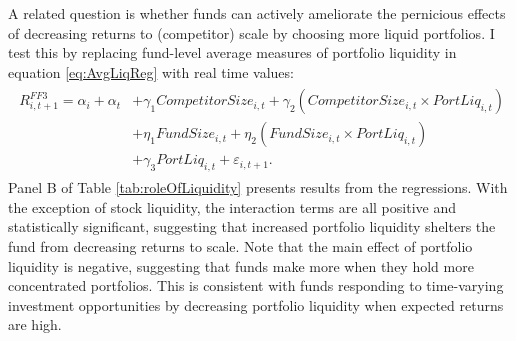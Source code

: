 \documentclass[]{book}
\theoremstyle{definition}
\theoremstyle{definition}
\theoremstyle{definition}
\theoremstyle{remark}
\begin{document}
A related question is whether funds can actively ameliorate the
pernicious effects of decreasing returns to (competitor) scale by
choosing more liquid portfolios. I test this by replacing fund-level
average measures of portfolio liquidity in equation \eqref{eq:AvgLiqReg}
with real time values: \begin{align}
\begin{split}
R^{FF3}_{i,t+1} = \alpha_i + \alpha_t &+ \gamma_1 CompetitorSize_{i,t} + \gamma_2 \left( CompetitorSize_{i,t} \times PortLiq_{i,t} \right) \\ 
&+ \eta_1 FundSize_{i,t} + \eta_2 \left( FundSize_{i,t} \times PortLiq_{i,t} \right)  \\
&+\gamma_3 PortLiq_{i,t} + \varepsilon_{i,t+1}.
\end{split}
\end{align} Panel B of Table \ref{tab:roleOfLiquidity} presents results
from the regressions. With the exception of stock liquidity, the
interaction terms are all positive and statistically significant,
suggesting that increased portfolio liquidity shelters the fund from
decreasing returns to scale. Note that the main effect of portfolio
liquidity is negative, suggesting that funds make more when they hold
more concentrated portfolios. This is consistent with funds responding
to time-varying investment opportunities by decreasing portfolio
liquidity when expected returns are high.


\end{document}
